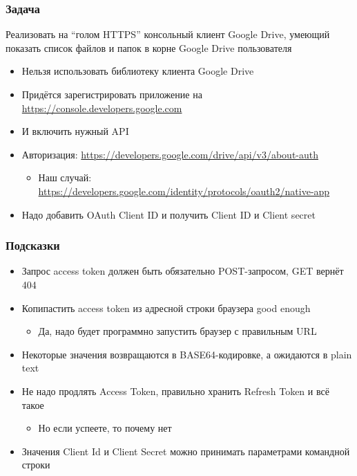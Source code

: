 \documentclass{../../slides-style}
\begin{document}
    \begin{frame}[plain]
        \titlepage
    \end{frame}

    \begin{frame}
        \frametitle{Задача}
        Реализовать на ``голом HTTPS'' консольный клиент Google Drive, умеющий показать список файлов и папок в корне Google Drive пользователя
        \begin{itemize}
            \item Нельзя использовать библиотеку клиента Google Drive
            \item Придётся зарегистрировать приложение на \url{https://console.developers.google.com}
            \item И включить нужный API
            \item Авторизация: \url{https://developers.google.com/drive/api/v3/about-auth}
            \begin{itemize}
                \item Наш случай: \url{https://developers.google.com/identity/protocols/oauth2/native-app}
            \end{itemize}
            \item Надо добавить OAuth Client ID и получить Client ID и Client secret
        \end{itemize}
    \end{frame}

    \begin{frame}
        \frametitle{Подсказки}
        \begin{itemize}
            \item Запрос access token должен быть обязательно POST-запросом, GET вернёт 404
            \item Копипастить access token из адресной строки браузера good enough
            \begin{itemize}
                \item Да, надо будет программно запустить браузер с правильным URL
            \end{itemize}
            \item Некоторые значения возвращаются в BASE64-кодировке, а ожидаются в plain text
            \item Не надо продлять Access Token, правильно хранить Refresh Token и всё такое
            \begin{itemize}
                \item Но если успеете, то почему нет
            \end{itemize}
            \item Значения Client Id и Client Secret можно принимать параметрами командной строки
        \end{itemize}
    \end{frame}
\end{document}
